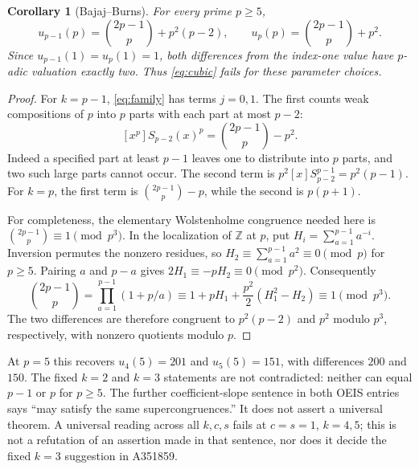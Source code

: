\documentclass[11pt]{article}
\newtheorem{corollary}[theorem]{Corollary}
\begin{document}
\begin{corollary}[Bajaj--Burns]\label{cor:obstruction}
For every prime $p\geq5$,
\[
 u_{p-1}(p)=\binom{2p-1}{p}+p^2(p-2),\qquad
 u_p(p)=\binom{2p-1}{p}+p^2.
\]
Since $u_{p-1}(1)=u_p(1)=1$, both differences from the index-one value
have $p$-adic valuation exactly two. Thus \eqref{eq:cubic} fails for
these parameter choices.
\end{corollary}
\begin{proof}
For $k=p-1$, \eqref{eq:family} has terms $j=0,1$. The first counts
weak compositions of $p$ into $p$ parts with each part at most $p-2$:
\[
 [x^p]S_{p-2}(x)^p=\binom{2p-1}{p}-p^2.
\]
Indeed a specified part at least $p-1$ leaves one to distribute into
$p$ parts, and two such large parts cannot occur. The second term is
$p^2[x]S_{p-2}^{p-1}=p^2(p-1)$. For $k=p$, the first term is
$\binom{2p-1}{p}-p$, while the second is $p(p+1)$.

For completeness, the elementary Wolstenholme congruence needed here is
$\binom{2p-1}{p}\equiv1\pmod{p^3}$. In the localization of $\mathbb Z$
at $p$, put $H_i=\sum_{a=1}^{p-1}a^{-i}$.
Inversion permutes the nonzero residues, so $H_2\equiv\sum_{a=1}^{p-1}a^2
\equiv0\pmod p$ for $p\geq5$.
Pairing $a$ and $p-a$ gives $2H_1\equiv-pH_2\equiv0\pmod{p^2}$.
Consequently
\[
 \binom{2p-1}{p}=\prod_{a=1}^{p-1}(1+p/a)
 \equiv1+pH_1+\frac{p^2}{2}(H_1^2-H_2)\equiv1\pmod{p^3}.
\]
The two differences are therefore congruent to $p^2(p-2)$ and $p^2$
modulo $p^3$, respectively, with nonzero quotients modulo $p$.
\end{proof}

At $p=5$ this recovers $u_4(5)=201$ and $u_5(5)=151$, with differences
$200$ and $150$. The fixed $k=2$ and $k=3$ statements are not contradicted:
neither can equal $p-1$ or $p$ for $p\geq5$.
The further coefficient-slope sentence in both OEIS entries says
``may satisfy the same supercongruences.'' It does not assert a universal
theorem. A universal reading across all $k,c,s$ fails at $c=s=1$, $k=4,5$;
this is not a refutation of an assertion made in that sentence, nor does it
decide the fixed $k=3$ suggestion in A351859.
\end{document}
